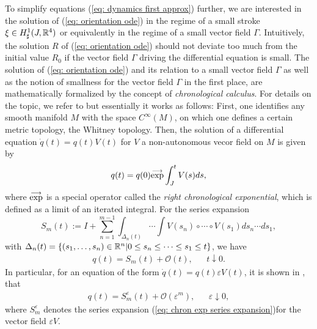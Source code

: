To simplify equations  (\ref{eq: dynamics first approx}) further, we are interested in the solution of (\ref{eq: orientation ode}) in the regime of a small stroke $\xi \in H_{\sharp}^1(J, \mathbb{R}^4)$ or equivalently in the regime of a small vector field $\Gamma$. Intuitively, the solution $R$ of (\ref{eq: orientation ode}) should not deviate too much from the initial value $R_0$ if the vector field $\Gamma$ driving the differential equation is small. The solution of (\ref{eq: orientation ode}) and its relation to a small vector field $\Gamma$ as well as the notion of smallness for the vector field $\Gamma$ in the first place, are mathematically formalized by the concept of \emph{chronological calculus}. For details on the topic, we refer to \cite{Agrachev2004} but essentially it works as follows: First, one identifies any smooth manifold $M$ with the space $C^{\infty}(M)$, on which one defines a certain metric topology, the Whitney topology. Then, the solution of a differential equation $\dot{q}(t) = q(t) V(t)$ for $V$ a non-autonomous vecor field on $M$ is given by
\begin{equation}
	q(t) = q(0)\overset{\longrightarrow}{\exp} \int_{J}^{t} V(s) ds,
\end{equation}
where $\overset{\longrightarrow}{\exp}$ is a special operator called the \emph{right chronological exponential}, which is defined as a limit of an iterated integral. For the series expansion
\begin{equation}
\label{eq: chron exp series expansion}
S_m(t) := I + \sum_{n = 1}^{m-1} \int_{\Delta_n(t)} \dotsm \int V(s_n) \circ \dotsm \circ V(s_1) ds_n \dotsm ds_1,
\end{equation}
with $\Delta_n(t) = \{(s_1, \dotsc, s_n) \in \mathbb{R}^n | 0 \leq s_n \leq \dotsm \leq s_1 \leq t\}$, we have
\begin{align}
q(t) = S_m(t) + \mathcal{O}(t), & & t \downarrow 0.
\end{align}
In particular, for an equation of the form $\dot{q}(t) = q(t) \varepsilon V(t)$, it is shown in \cite{Agrachev2004}, that
\begin{align}
\label{eq: estimation of chronological exponential}
	q(t) = S_m^{\varepsilon}(t) + \mathcal{O}(\varepsilon^m), & & \varepsilon \downarrow 0,
\end{align}
where $S_{m}^{\varepsilon}$ denotes the series expansion (\ref{eq: chron exp series expansion})for the vector field $\varepsilon V$.

